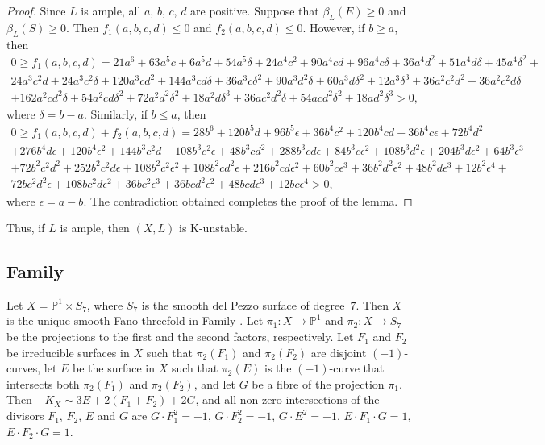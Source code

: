 \documentclass[12pt]{amsart}
\theoremstyle{definition}
\theoremstyle{remark}
\begin{document}
\begin{proof}
Since $L$ is ample, all $a$, $b$, $c$, $d$ are positive. Suppose that $\beta_L(E)\geqslant 0$ and $\beta_L(S)\geqslant 0$. Then $f_1(a,b,c,d)\leqslant 0$ and $f_2(a,b,c,d)\leqslant 0$. However, if $b\geqslant a$, then
\begin{multline*}
0\geqslant f_1(a,b,c,d)=21a^6+63a^5c+6a^5d+54a^5\delta+24a^4c^2+90a^4cd+96a^4c\delta+36a^4d^2+51a^4d\delta
+45a^4\delta^2+\\24a^3c^2d+24a^3c^2\delta+120a^3cd^2+144a^3cd\delta+36a^3c\delta^2+90a^3d^2\delta+60a^3d\delta^2+12a^3\delta^3+36a^2c^2d^2+36a^2c^2d\delta\\+162a^2cd^2\delta+54a^2cd\delta^2
+72a^2d^2\delta^2+18a^2d\delta^3+36ac^2d^2\delta+54acd^2\delta^2+18ad^2\delta^3>0,
\end{multline*}
where $\delta=b-a$. Similarly, if $b\leqslant a$, then
\begin{multline*}
0\geqslant f_1(a,b,c,d)+f_2(a,b,c,d)=28b^6+120b^5d+96b^5\epsilon+36b^4c^2+120b^4cd+36b^4c\epsilon
+72b^4d^2\\+276b^4d\epsilon+120b^4\epsilon^2+144b^3c^2d+108b^3c^2\epsilon+48b^3cd^2+288b^3cd\epsilon+84b^3c\epsilon^2
+108b^3d^2\epsilon+204b^3d\epsilon^2+64b^3\epsilon^3\\+72b^2c^2d^2+252b^2c^2d\epsilon+108b^2c^2\epsilon^2+108b^2cd^2\epsilon
+216b^2cd\epsilon^2+60b^2c\epsilon^3+36b^2d^2\epsilon^2+48b^2d\epsilon^3+12b^2\epsilon^4+\\72bc^2d^2\epsilon
+108bc^2d\epsilon^2+ 36bc^2\epsilon^3+36bcd^2\epsilon^2+48bcd\epsilon^3+12bc\epsilon^4>0,
\end{multline*}
where $\epsilon=a-b$. The contradiction obtained completes the proof of the lemma.
\end{proof}

Thus, if $L$ is ample, then $(X,L)$ is K-unstable.


\subsection{Family }
\label{subsection:4-10}

Let $X=\mathbb{P}^1\times S_7$, where $S_7$ is the smooth del Pezzo surface of degree~$7$.
Then $X$ is the unique smooth Fano threefold in Family .
Let $\pi_1\colon X\to\mathbb{P}^1$ and $\pi_2\colon X\to S_7$ be the projections to the first and the second factors, respectively.
Let $F_1$ and $F_2$ be irreducible surfaces in $X$ such that $\pi_2(F_1)$ and $\pi_2(F_2)$ are disjoint $(-1)$-curves,
let $E$ be the surface in $X$ such that $\pi_2(E)$ is the $(-1)$-curve that intersects both $\pi_2(F_1)$ and $\pi_2(F_2)$,
and let $G$ be a fibre of the projection $\pi_1$. Then $-K_X\sim 3E+2(F_1+F_2)+2G$,
and all non-zero intersections of the divisors $F_1$, $F_2$, $E$ and $G$ are
$G\cdot F_1^2=-1$, $G\cdot F_2^2=-1$, $G\cdot E^2=-1$, $E\cdot F_1\cdot G=1$, $E\cdot F_2\cdot G=1$.
\end{document}
